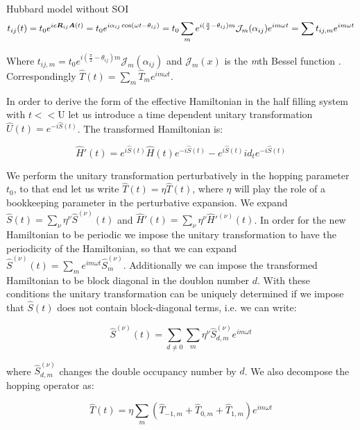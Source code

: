 \begin{section}{Hubbard model without SOI}
\begin{align*}
t_{ij}(t) = t_0e^{ie\boldsymbol{R}_{ij}\boldsymbol{A}(t)} = t_0e^{i\alpha_{ij} \cos(\omega t - \theta_{ij})} = t_0 \sum_m e^{i(\frac{\pi}{2}-\theta_{ij})m} \mathcal{J}_m(\alpha_{ij}) e^{im\omega t} = \sum t_{ij,m} e^{im\omega t}
\end{align*}

Where $t_{ij,m} = t_0 e^{i(\frac{\pi}{2}-\theta_{ij})m} \mathcal{J}_m(\alpha_{ij})$ and $\mathcal{J}_m(x)$ is the \textit{m}th Bessel function \cite{Kitamura2017}. Correspondingly $\hat{T}(t) = \sum_m \hat{T}_m e^{im \omega t}$.

In order to derive the form of the effective Hamiltonian in the half filling system with $t << \text{U}$ let us introduce a time dependent unitary transformation $\hat{U}(t) = e^{-i\hat{S}(t)}$. The transformed Hamiltonian is:

\begin{equation}
\hat{H}'(t) = e^{i\hat{S}(t)} \hat{H}(t) e^{-i\hat{S}(t)} - e^{i\hat{S}(t)} id_t e^{-i\hat{S}(t)}
\end{equation} 

We perform the unitary transformation perturbatively in the hopping parameter $t_0$, to that end let us write $\hat{T}(t) = \eta \hat{T}(t)$, where $\eta$ will play the role of a bookkeeping parameter in the perturbative expansion. We expand $\hat{S}(t) = \sum_\nu \eta^\nu \hat{S}^{(\nu)}(t)$ and $\hat{H}'(t) = \sum_\nu \eta^\nu \hat{H}'^{(\nu)}(t)$. In order for the new Hamiltonian to be periodic we impose the unitary transformation to have the periodicity of the Hamiltonian, so that we can expand $\hat{S}^{(\nu)}(t) = \sum_m e^{im\omega t}\hat{S}^{(\nu)}_m$. Additionally we can impose the transformed Hamiltonian to be block diagonal in the doublon number $d$. With these conditions the unitary transformation can be uniquely determined if we impose that $\hat{S}(t)$ does not contain block-diagonal terms, i.e. we can write:

\begin{equation}
\hat{S}^{(\nu)}(t) = \sum_{d \neq 0} \sum_m \eta^\nu \hat{S}^{(\nu)}_{d,m} e^{im\omega t}
\end{equation}

where $\hat{S}^{(\nu)}_{d,m}$ changes the double occupancy number by $d$. We also decompose the hopping operator as:

\begin{equation}
\hat{T}(t) = \eta \sum_m (\hat{T}_{-1,m}+\hat{T}_{0,m}+\hat{T}_{1,m})e^{im\omega t}
\end{equation}


\end{section}
